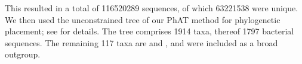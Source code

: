 This resulted in a total of \num{116 520 289} sequences, of which \num{63 221 538} were unique.
We then used the unconstrained  tree of our \ac{PhAT} method \cite{Czech2018-phat}
for phylogenetic placement;
see  for details.
The tree comprises \num{1 914} taxa, thereof \num{1 797} bacterial sequences.
The remaining \num{117} taxa are  and ,
and were included as a broad outgroup.



